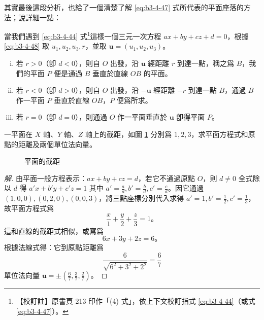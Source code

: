 其實最後這段分析，也給了一個清楚了解 \eqref{eq:b3-4-47} 式所代表的平面座落的方法；說詳細一點：

當我們遇到 \eqref{eq:b3-4-44} 式\footnote{\label{note:b3-ch4-p213-equation-ref}【校訂註】原書頁 213 印作「(4) 式」，依上下文校訂指式 \eqref{eq:b3-4-44}（或式 \eqref{eq:b3-4-47}）。}這樣一個三元一次方程 $ax + by + cz + d = 0$，根據 \eqref{eq:b3-4-48} 取 $u_1, u_2, u_3, r$，並取 $\mathbf{u} = (u_1, u_2, u_3)$。
\begin{enumerate}[(i)]
  \item 若 $r > 0$（卽 $d < 0$），則自 $O$ 出發，沿 $\mathbf{u}$ 經距離 $r$ 到達一點，稱之爲 $B$，我們的平面 $P$ 便是通過 $B$ 垂直於直線 $OB$ 的平面。
  \item 若 $r < 0$（卽 $d > 0$），則自 $O$ 出發，沿 $-\mathbf{u}$ 經距離 $-r$ 到達一點 $B$，通過 $B$ 作一平面 $P$ 垂直於直線 $OB$，$P$ 便爲所求。
  \item 若 $r = 0$（卽 $d = 0$），則通過 $O$ 作一平面垂直於 $\mathbf{u}$ 卽得平面 $P$。
\end{enumerate}

\begin{example}
一平面在 $X$ 軸、$Y$ 軸、$Z$ 軸上的截距，如圖 \ref{fig:4-68} 分別爲 $1, 2, 3$，求平面方程式和原點的距離及兩個單位法向量。
\end{example}

\begin{figure}[H]
\centering
{}
\caption{平面的截距}
\label{fig:4-68}
\end{figure}

\begin{proof}[解]
由平面一般方程表示：$ax + by + cz = d$，若它不通過原點 $O$，則 $d \neq 0$ 全式除以 $d$ 得 $a'x + b'y + c'z = 1$ 其中 $a' = \frac{a}{d}, b' = \frac{b}{d}, c' = \frac{c}{d}$。因它通過 $(1, 0, 0), (0, 2, 0), (0, 0, 3)$，將三點座標分別代入求得 $a' = 1, b' = \frac{1}{2}, c' = \frac{1}{3}$，故平面方程式爲
\[
\frac{x}{1} + \frac{y}{2} + \frac{z}{3} = 1\text{。}
\]
這和直線的截距式相似，或寫爲
\[
6x + 3y + 2z = 6\text{。}
\]
根據法線式得：它到原點距離爲
\[
\frac{6}{\sqrt{6^2 + 3^2 + 2^2}} = \frac{6}{7}
\]
單位法向量 $\mathbf{u} = \pm \left(\frac{6}{7}, \frac{3}{7}, \frac{2}{7}\right)$。 \qedhere
\end{proof}

